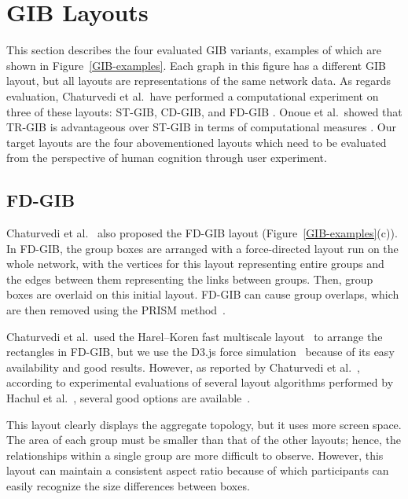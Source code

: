 \documentclass{vgtc}                          %
\begin{document}
\section{GIB Layouts}
This section describes the four evaluated GIB variants, examples of which are shown in Figure~\ref{GIB-examples}.
Each graph in this figure has a different GIB layout, but all layouts are representations of the same network data.
As regards evaluation, Chaturvedi et al.\ have performed a computational experiment on three of these layouts: ST-GIB, CD-GIB, and FD-GIB \cite{chaturvedi2014group}.
Onoue et al.\ showed that TR-GIB is advantageous over ST-GIB in terms of computational measures \cite{onoue2017optimal}.
Our target layouts are the four abovementioned layouts which need to be evaluated from the perspective of human cognition through user experiment.

\subsection{FD-GIB}
Chaturvedi et al.~\cite{chaturvedi2014group} also proposed the FD-GIB layout (Figure~\ref{GIB-examples}(c)).
In FD-GIB, the group boxes are arranged with a force-directed layout run on the whole network, with the vertices for this layout representing entire groups and the edges between them representing the links between groups.
Then, group boxes are overlaid on this initial layout.%
FD-GIB can cause group overlaps, which are then removed using the PRISM method~\cite{gansner2008efficient}.

Chaturvedi et al.\ used the Harel--Koren fast multiscale layout~\cite{harel2002graph} to arrange the rectangles in FD-GIB, but we use the D3.js force simulation~\cite{Bostock:2011:DDD:2068462.2068631} because of its easy availability and good results.
However, as reported by Chaturvedi et al.~\cite{chaturvedi2014group}, according to experimental evaluations of several layout algorithms performed by Hachul et al.~\cite{Hachul:2005:ECF:2102325.2102348,Hachul2007LargeGraphLA}, several good options are available~\cite{harel2002graph,koren2003drawing}.

This layout clearly displays the aggregate topology, but it uses more screen space.
The area of each group must be smaller than that of the other layouts; hence, the relationships within a single group are more difficult to observe. However, this layout can maintain a consistent aspect ratio because of which participants can easily recognize the size differences between boxes.
\end{document}
